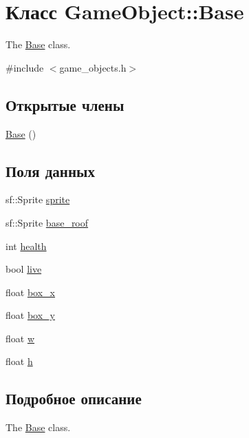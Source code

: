 \hypertarget{classGameObject_1_1Base}{}\section{Класс Game\+Object\+:\+:Base}
\label{classGameObject_1_1Base}


The \hyperlink{classGameObject_1_1Base}{Base} class.  




{\ttfamily \#include $<$game\+\_\+objects.\+h$>$}

\subsection*{Открытые члены}
\begin{DoxyCompactItemize}
\item 
\hyperlink{classGameObject_1_1Base_a31c0f6c9e600dacf73e76673b1a13c1e}{Base} ()
\end{DoxyCompactItemize}
\subsection*{Поля данных}
\begin{DoxyCompactItemize}
\item 
sf\+::\+Sprite \hyperlink{classGameObject_1_1Base_ab8f40bafa7b9290ffa287df2b75eb49f}{sprite}
\item 
sf\+::\+Sprite \hyperlink{classGameObject_1_1Base_a585759d198272b88275e6757d0cb9b2e}{base\+\_\+roof}
\item 
int \hyperlink{classGameObject_1_1Base_aafab029af0a095c1b7751b94a630d5a8}{health}
\item 
bool \hyperlink{classGameObject_1_1Base_ad5b542f2b0694adbcdf26a088ab7394a}{live}
\item 
float \hyperlink{classGameObject_1_1Base_a253d1b270383dde6a83bcced281df00e}{box\+\_\+x}
\item 
float \hyperlink{classGameObject_1_1Base_a6524bcc9f2c8581932f7bd474ddecc63}{box\+\_\+y}
\item 
float \hyperlink{classGameObject_1_1Base_ab8c68f4cc3270595be6867e2d0c4c8a4}{w}
\item 
float \hyperlink{classGameObject_1_1Base_afbfe39f23eea3c89426e1053ec1a064e}{h}
\end{DoxyCompactItemize}


\subsection{Подробное описание}
The \hyperlink{classGameObject_1_1Base}{Base} class. 

